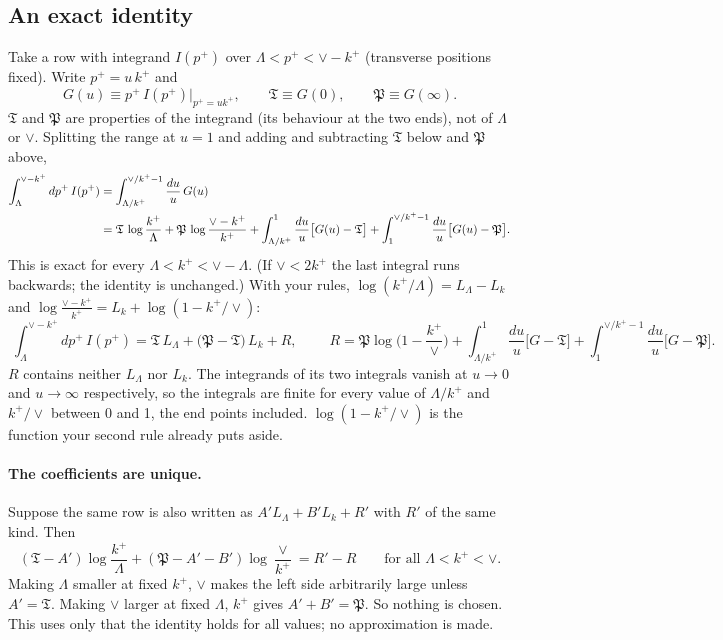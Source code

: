\documentclass[10pt]{article}
\numberwithin{equation}{section}
\newcommand{\LL}{L_\Lambda}
\newcommand{\Lk}{L_k}
\newcommand{\T}{\mathfrak T}
\newcommand{\PP}{\mathfrak P}
\begin{document}
\subsection{An exact identity}\label{sec:exact}
Take a row with integrand $I(p^+)$ over $\Lambda<p^+<\vee-k^+$ (transverse positions fixed). Write $p^+=u\,k^+$ and
\begin{equation}
G(u)\equiv p^+\,I(p^+)\Big|_{p^+=uk^+},\qquad \T\equiv G(0),\qquad \PP\equiv G(\infty).
\end{equation}
$\T$ and $\PP$ are properties of the integrand (its behaviour at the two ends), not of $\Lambda$ or $\vee$. Splitting the range at $u=1$ and adding and subtracting $\T$ below and $\PP$ above,
\begin{align}
\int_\Lambda^{\vee-k^+}dp^+\,I(p^+)&=\int_{\Lambda/k^+}^{\vee/k^+-1}\frac{du}{u}\,G(u)\notag\\
&=\T\,\log\frac{k^+}{\Lambda}+\PP\,\log\frac{\vee-k^+}{k^+}+\int_{\Lambda/k^+}^{1}\frac{du}{u}\big[G(u)-\T\big]+\int_{1}^{\vee/k^+-1}\frac{du}{u}\big[G(u)-\PP\big].
\label{eq:exact}
\end{align}
This is exact for every $\Lambda<k^+<\vee-\Lambda$. (If $\vee<2k^+$ the last integral runs backwards; the identity is unchanged.) With your rules, $\log(k^+/\Lambda)=\LL-\Lk$ and $\log\frac{\vee-k^+}{k^+}=\Lk+\log(1-k^+/\vee)$:
\begin{equation}
\boxed{\;\int_\Lambda^{\vee-k^+}dp^+\,I(p^+)=\T\,\LL+\big(\PP-\T\big)\,\Lk+R,\;}
\qquad R=\PP\log\Big(1-\frac{k^+}{\vee}\Big)+\int_{\Lambda/k^+}^{1}\frac{du}{u}\big[G-\T\big]+\int_{1}^{\vee/k^+-1}\frac{du}{u}\big[G-\PP\big].
\label{eq:exact2}
\end{equation}
$R$ contains neither $\LL$ nor $\Lk$. The integrands of its two integrals vanish at $u\to0$ and $u\to\infty$ respectively, so the integrals are finite for every value of $\Lambda/k^+$ and $k^+/\vee$ between 0 and 1, the end points included. $\log(1-k^+/\vee)$ is the function your second rule already puts aside.

\paragraph{The coefficients are unique.} Suppose the same row is also written as $A'\LL+B'\Lk+R'$ with $R'$ of the same kind. Then
\begin{equation}
(\T-A')\log\frac{k^+}{\Lambda}+(\PP-A'-B')\log\frac{\vee}{k^+}=R'-R\qquad\text{for all }\Lambda<k^+<\vee .
\end{equation}
Making $\Lambda$ smaller at fixed $k^+$, $\vee$ makes the left side arbitrarily large unless $A'=\T$. Making $\vee$ larger at fixed $\Lambda$, $k^+$ gives $A'+B'=\PP$. So nothing is chosen. This uses only that the identity holds for all values; no approximation is made.
\end{document}
